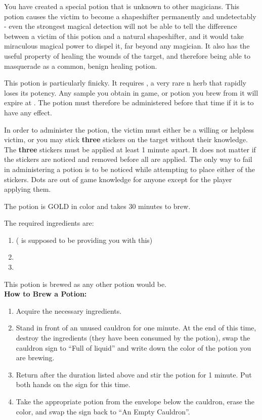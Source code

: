 \documentclass[green]{NeptuneBall}
\begin{document}
\name{\gShapeshifter{}}

You have created a special potion that is unknown to other magicians. This potion causes the victim to become a shapeshifter permanently and undetectably - even the strongest magical detection will not be able to tell the difference between a victim of this potion and a natural shapeshifter, and it would take miraculous magical power to dispel it, far beyond any magician. It also has the useful property of healing the wounds of the target, and therefore being able to masquerade as a common, benign healing potion.

This potion is particularly finicky. It requires \iHemlock{}, a very rare \pPacifica{}n herb that rapidly loses its potency. Any sample you obtain in game, or potion you brew from it will expire at \cTThree{\MYname{}}. The potion must therefore be administered before that time if it is to have any effect.

In order to administer the potion, the victim must either be a willing or helpless victim, or you may stick {\bf three} stickers on the target without their knowledge. The {\bf three} stickers must be applied at least 1 minute apart. It does not matter if the stickers are noticed and removed before all are applied. The only way to fail in administering a potion is to be noticed while attempting to place either of the stickers. Dots are out of game knowledge for anyone except for the player applying them.

The potion is GOLD in color and takes 30 minutes to brew. 

The required ingredients are:
\begin{enumerate}
\item \iHemlock{} (\cSpy{} is supposed to be providing you with this)
\item \iSquid{}
\item \iBarnacle{}
\end{enumerate}

This potion is brewed as any other potion would be.\\

{\bf How to Brew a Potion:}\\ %
\begin{enumerate}
  \item Acquire the necessary ingredients.
  \item Stand in front of an unused cauldron for one minute. At the end of this time, destroy the ingredients (they have been consumed by the potion), swap the cauldron sign to ``Full of liquid'' and write down the color of the potion you are brewing.
  \item Return after the duration listed above and stir the potion for 1 minute. Put both hands on the sign for this time.
  \item Take the appropriate potion from the envelope below the cauldron, erase the color, and swap the sign back to ``An Empty Cauldron''.
\end{enumerate}
\end{document}
